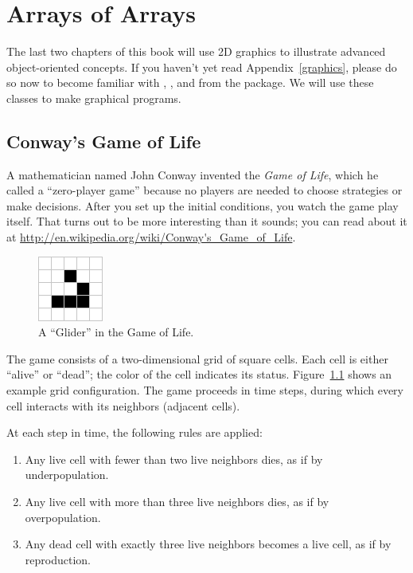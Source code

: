 \chapter{Arrays of Arrays}

The last two chapters of this book will use 2D graphics to illustrate advanced object-oriented concepts.
If you haven't yet read Appendix~\ref{graphics}, please do so now to become familiar with , , and  from the  package.
We will use these classes to make graphical programs.


\section{Conway's Game of Life}

A mathematician named John Conway invented the {\it Game of Life}, which he called a ``zero-player game'' because no players are needed to choose strategies or make decisions.
After you set up the initial conditions, you watch the game play itself.
That turns out to be more interesting than it sounds; you can read about it at \url{http://en.wikipedia.org/wiki/Conway's_Game_of_Life}.

\begin{figure}[!ht]
\begin{center}
\includegraphics{figs/glider.png}
\caption{A ``Glider'' in the Game of Life.}
\label{fig:glider}
\end{center}
\end{figure}

The game consists of a two-dimensional grid of square cells.
Each cell is either ``alive'' or ``dead''; the color of the cell indicates its status.
Figure~\ref{fig:glider} shows an example grid configuration.
The game proceeds in time steps, during which every cell interacts with its neighbors (adjacent cells).

At each step in time, the following rules are applied:
\begin{enumerate}
\item Any live cell with fewer than two live neighbors dies, as if by underpopulation.
\item Any live cell with more than three live neighbors dies, as if by overpopulation.
\item Any dead cell with exactly three live neighbors becomes a live cell, as if by reproduction.
\end{enumerate}

